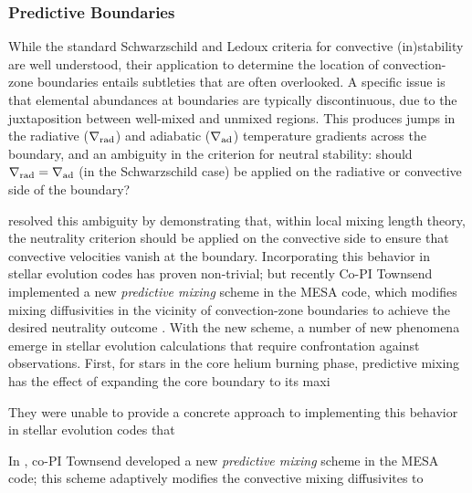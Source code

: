 {\color{brown}
\subsubsection{Predictive Boundaries}

While the standard Schwarzschild and Ledoux criteria for convective (in)stability are well understood, their application to determine the location of convection-zone boundaries entails subtleties that are often overlooked. A specific issue is that elemental abundances at boundaries are typically discontinuous, due to the juxtaposition between well-mixed and unmixed regions. This produces jumps in the radiative ($\nabla_{\rm rad}$) and adiabatic ($\nabla_{\rm ad}$) temperature gradients across the boundary, and an ambiguity in the criterion for neutral stability: should $\nabla_{\rm rad}=\nabla_{\rm ad}$ (in the Schwarzschild case) be applied on the radiative or convective side of the boundary?

\citet{Gabriel:2014} resolved this ambiguity by demonstrating that, within local mixing length theory, the neutrality criterion should be applied on the convective side to ensure that convective velocities vanish at the boundary. Incorporating this behavior in stellar evolution codes has proven non-trivial; but recently Co-PI Townsend implemented a new \emph{predictive mixing} scheme in the MESA code, which modifies mixing diffusivities in the vicinity of convection-zone boundaries to achieve the desired neutrality outcome \citep[see][]{Paxton:2017}. With the new scheme, a number of new phenomena emerge in stellar evolution calculations that require confrontation against observations. First, for stars in the core helium burning phase, predictive mixing has the effect of expanding the core boundary to its maxi

They were unable to provide a concrete approach to implementing this behavior in stellar evolution codes that

In \citet{Paxton:2017}, co-PI Townsend developed a new \emph{predictive mixing} scheme in the MESA code; this scheme adaptively modifies the convective mixing diffusivites to 

}